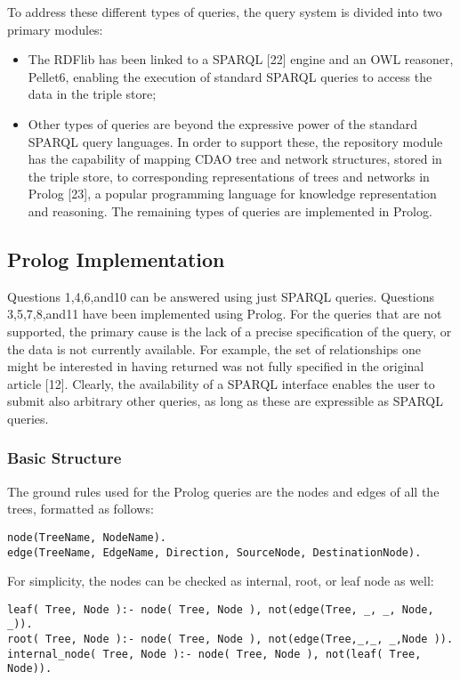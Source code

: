 \documentclass[10pt]{article}
\begin{document}
To address these different types of queries, the query system is divided into two primary modules:
\begin{itemize}
\item The RDFlib has been linked to a SPARQL [22] engine and an OWL reasoner, Pellet6, enabling the execution of standard SPARQL queries to access the data in the triple store;
\item Other types of queries are beyond the expressive power of the standard SPARQL query languages. In order to support these, the repository module has the capability of mapping CDAO tree and network structures, stored in the triple store, to corresponding representations of trees and networks in Prolog [23], a popular programming language for knowledge representation and reasoning. The remaining types of queries are implemented in Prolog.
\end{itemize}

\subsection{Prolog Implementation}
Questions 1,4,6,and10 can be answered using just SPARQL queries.  Questions 3,5,7,8,and11 have been implemented using Prolog.   For the queries that are not supported, the primary cause is the lack of a precise specification of the query, or the data is not currently available. For example, the set of relationships one might be interested in having returned was not fully specified in the original article [12].  Clearly, the availability of a SPARQL interface enables the user to submit also arbitrary other queries, as long as these are expressible as SPARQL queries.
\subsubsection{Basic Structure}

The ground rules used for the Prolog queries are the nodes and edges of all the trees, formatted as follows:
\begin{verbatim}
node(TreeName, NodeName).
edge(TreeName, EdgeName, Direction, SourceNode, DestinationNode).
\end{verbatim}

For simplicity, the nodes can be checked as internal, root, or leaf node as well:
\begin{verbatim}
leaf( Tree, Node ):- node( Tree, Node ), not(edge(Tree, _, _, Node, _)).
root( Tree, Node ):- node( Tree, Node ), not(edge(Tree,_,_, _,Node )).
internal_node( Tree, Node ):- node( Tree, Node ), not(leaf( Tree, Node)).
\end{verbatim}
\end{document}
